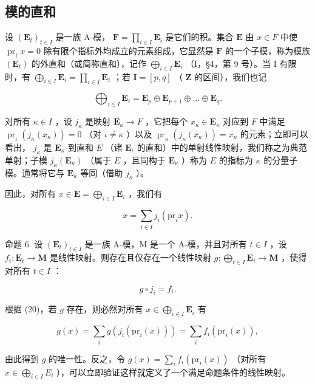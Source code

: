 \subsection{模的直和}

设 \((\mathbf{E}_t)_{t \in I}\) 是一族 A-模， \(\mathbf{F} = \prod_{i \in I} \mathbf{E}_i\) 是它们的积。集合 \(\mathbf{E}\) 由 \(x \in F\) 中使 \(\operatorname{pr}_t x = 0\) 除有限个指标外均成立的元素组成，它显然是 \(\mathbf{F}\) 的一个子模，称为模族 \((\mathbf{E}_t)\) 的外直和（或简称直和），记作 \(\bigoplus_{i \in I} \mathbf{E}_i\) （I，§4，第 9 号）。当 I 有限时，有 \(\bigoplus_{i \in I} \mathbf{E}_i = \prod_{i \in I} \mathbf{E}_t\) ；若 \(\mathbf{I} = [p, q]\) （ \(\mathbf{Z}\) 的区间），我们也记

\[
\bigoplus_ {i \in I} \mathbf {E} _ {i} = \mathbf {E} _ {p} \oplus \mathbf {E} _ {p + 1} \oplus \dots \oplus \mathbf {E} _ {q}.
\]

对所有 \(\kappa \in I\) ，设 \(j_{\kappa}\) 是映射 \(\mathbf{E}_{\kappa} \to F\) ，它把每个 \(x_{\kappa} \in \mathbf{E}_{\kappa}\) 对应到 \(F\) 中满足 \(\operatorname{pr}_{\iota}(j_{\kappa}(x_{\kappa})) = 0\) （对 \(\iota \neq \kappa\) ）以及 \(\operatorname{pr}_{\kappa}(j_{\kappa}(x_{\kappa})) = x_{\kappa}\) 的元素；立即可以看出， \(j_{\kappa}\) 是 \(\mathbf{E}_{\kappa}\) 到直和 \(E\) （诸 \(\mathbf{E}_{\iota}\) 的直和）中的单射线性映射，我们称之为典范单射；子模 \(j_{\kappa}(\mathbf{E}_{\kappa})\) （属于 \(E\) ，且同构于 \(\mathbf{E}_{\kappa}\) ）称为 \(E\) 的指标为 \(\kappa\) 的分量子模。通常将它与 \(\mathbf{E}_{\kappa}\) 等同（借助 \(j_{\kappa}\) ）。

因此，对所有 \(x \in \mathbf{E} = \bigoplus_{i \in I} \mathbf{E}_i\) ，我们有

\[
x = \sum_ {i \in I} j _ {i} (\mathrm{pr} _ {i} x).\tag{20}
\]

命题 6. 设 \((\mathbf{E}_t)_{t \in I}\) 是一族 A-模，M 是一个 A-模，并且对所有 \(t \in I\) ，设 \(f_t: \mathbf{E}_t \to \mathbf{M}\) 是线性映射。则存在且仅存在一个线性映射 \(g: \bigoplus_{t \in I} \mathbf{E}_t \to \mathbf{M}\) ，使得对所有 \(t \in I\) ：

\[
g \circ j _ {i} = f _ {i}.\tag{21}
\]

根据 (20)，若 \(g\) 存在，则必然对所有 \(x \in \bigoplus_{\iota \in I} \mathbf{E}_{\iota}\) 有

\[
g (x) = \sum_ {i} g (j _ {i} (\mathrm{pr} _ {i} (x))) = \sum_ {i} f _ {i} (\mathrm{pr} _ {i} (x)),
\]

由此得到 \(g\) 的唯一性。反之，令 \(g(x) = \sum_{i} f_i(\mathrm{pr}_i(x))\) （对所有 \(x \in \bigoplus_{i \in I} E_i\) ），可以立即验证这样就定义了一个满足命题条件的线性映射。

